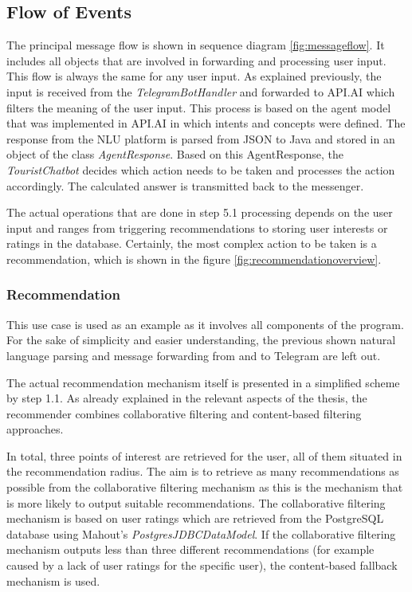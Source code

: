 \subsection{Flow of Events}
The principal message flow is shown in sequence diagram \ref{fig:messageflow}. It includes all objects that are involved in forwarding and processing user input. This flow is always the same for any user input. As explained previously, the input is received from the \textit{TelegramBotHandler} and forwarded to API.AI which filters the meaning of the user input. This process is based on the agent model that was implemented in API.AI in which intents and concepts were defined. The response from the NLU platform is parsed from JSON to Java and stored in an object of the class \textit{AgentResponse}. Based on this AgentResponse, the \textit{TouristChatbot} decides which action needs to be taken and processes the action accordingly. The calculated answer is transmitted back to the messenger. 


The actual operations that are done in step 5.1 processing depends on the user input and ranges from triggering recommendations to storing user interests or ratings in the database. Certainly, the most complex action to be taken is a recommendation, which is shown in the figure \ref{fig:recommendationoverview}. 

\subsubsection{Recommendation} \label{recommendationmec}
This use case is used as an example as it involves all components of the program.  For the sake of simplicity and easier understanding, the previous shown natural language parsing and message forwarding from and to Telegram are left out.


The actual recommendation mechanism itself is presented in a simplified scheme by step 1.1. As already explained in the relevant aspects of the thesis, the recommender combines collaborative filtering and content-based filtering approaches. 

In total, three points of interest are retrieved for the user, all of them situated in the recommendation radius. The aim is to retrieve as many recommendations as possible from the collaborative filtering mechanism as this is the mechanism that is more likely to output suitable recommendations. The collaborative filtering mechanism is based on user ratings which are retrieved from the PostgreSQL database using Mahout’s  \textit{PostgresJDBCDataModel}.  If the collaborative filtering mechanism outputs less than three different recommendations (for example caused by a lack of user ratings for the specific user), the content-based fallback mechanism is used.


